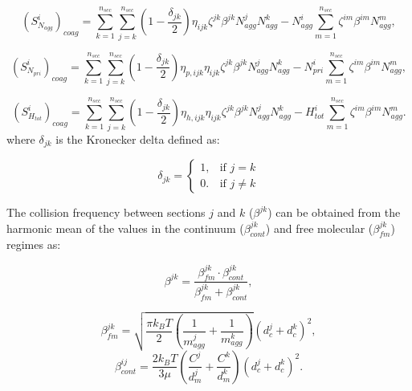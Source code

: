 \begin{equation}
	\left(S^i_{N_{agg}}\right)_{coag}
	=
	\sum_{k=1}^{n_{sec}}\sum_{j=k}^{n_{sec}}
	\left(
	1-\frac{\delta_{jk}}{2}
	\right)
	\eta_{ijk}\zeta^{jk}\beta^{jk}N^j_{agg}N^k_{agg}
	-
	N^i_{agg}
	\sum_{m=1}^{n_{sec}}\zeta^{im}\beta^{im}N^m_{agg},
	\label{eqn:IcoagNaggsect}
\end{equation}

\begin{equation}
	\left(S^i_{N_{pri}}\right)_{coag}
	=
	\sum_{k=1}^{n_{sec}}\sum_{j=k}^{n_{sec}}
	\left(
	1-\frac{\delta_{jk}}{2}
	\right)
	\eta_{p,ijk}\eta_{ijk}\zeta^{jk}\beta^{jk}N^j_{agg}N^k_{agg}
	-
	N^i_{pri}
	\sum_{m=1}^{n_{sec}}\zeta^{im}\beta^{im}N^m_{agg},
	\label{eqn:IcoagNprisect}
\end{equation}

\begin{equation}
	\left(S^i_{H_{tot}}\right)_{coag}
	=
	\sum_{k=1}^{n_{sec}}\sum_{j=k}^{n_{sec}}
	\left(
	1-\frac{\delta_{jk}}{2}
	\right)
	\eta_{h,ijk}\eta_{ijk}\zeta^{jk}\beta^{jk}N^j_{agg}N^k_{agg}
	-
	H^i_{tot}
	\sum_{m=1}^{n_{sec}}\zeta^{im}\beta^{im}N^m_{agg}.
	\label{eqn:IcoagHtotsect}
\end{equation}
\noindent where ${\delta_{jk}}$ is the Kronecker delta defined as:

\begin{equation}
	\delta_{jk}=
	\left\{
	\begin{array}{lr}
		1, & \text{if } j = k\\
		0. & \text{if } j \neq k
	\end{array}
	\right.
	\label{eqn:deltakronecker}
\end{equation}

The collision frequency between sections $j$ and $k$ ($\beta^{jk}$) can be obtained from the harmonic mean of the values in the continuum ($\beta_{cont}^{jk}$) and free molecular ($\beta_{fm}^{jk}$) regimes as:

\begin{equation}
	\beta^{jk} = 				       \frac{\beta^{jk}_{fm}\cdot\beta^{jk}_{cont}}{\beta^{jk}_{fm}
		+\beta^{jk}_{cont}}
	\label{eqn:betahmsect},
\end{equation}

\begin{equation}
	\beta^{jk}_{fm} =
	\sqrt{
		\frac{\pi k_B T}{2}
		\left(
		\frac{1}{m^j_{agg}}+
		\frac{1}{m^k_{agg}}
		\right)
	} 
	\left(
	d^j_c+d^k_c
	\right)^2
	\label{eqn:betafmsect},
\end{equation}
\begin{equation}
	\beta^{ij}_{cont} = \frac{2k_BT}{3\mu}
	\left(
	\frac{C^j}{d^j_m}+
	\frac{C^k}{d^k_m}
	\right)
	\left(
	d^j_c+d^k_c
	\right)^2
	\label{eqn:betacontsect}.
\end{equation}

